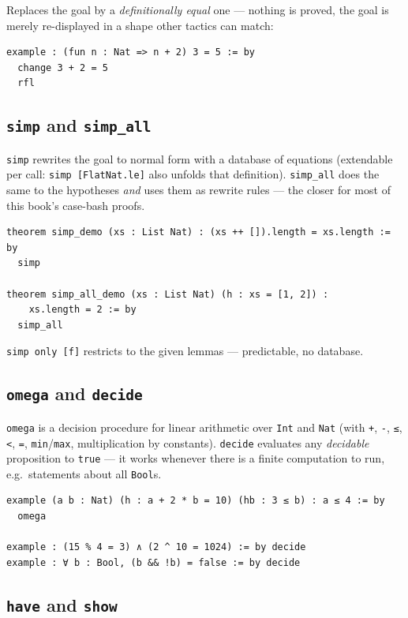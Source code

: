 \documentclass[12pt, a4paper, openright]{book}
\theoremstyle{thmstyle}
\theoremstyle{defstyle}
\newcommand{\lc}[1]{\texttt{#1}}
\begin{document}
Replaces the goal by a \emph{definitionally equal} one --- nothing is
proved, the goal is merely re-displayed in a shape other tactics can
match:

\begin{verbatim}
example : (fun n : Nat => n + 2) 3 = 5 := by
  change 3 + 2 = 5
  rfl
\end{verbatim}

\subsection*{\lc{simp} and \lc{simp\_all}}

\lc{simp} rewrites the goal to normal form with a database of equations
(extendable per call: \lc{simp [FlatNat.le]} also unfolds that
definition). \lc{simp\_all} does the same to the hypotheses \emph{and}
uses them as rewrite rules --- the closer for most of this book's
case-bash proofs.

\begin{verbatim}
theorem simp_demo (xs : List Nat) : (xs ++ []).length = xs.length := by
  simp

theorem simp_all_demo (xs : List Nat) (h : xs = [1, 2]) :
    xs.length = 2 := by
  simp_all
\end{verbatim}

\lc{simp only [f]} restricts to the given lemmas --- predictable, no
database.

\subsection*{\lc{omega} and \lc{decide}}

\lc{omega} is a decision procedure for linear arithmetic over \lc{Int} and
\lc{Nat} (with \lc{+}, \lc{-}, \lc{≤}, \lc{<}, \lc{=}, \lc{min}/\lc{max},
multiplication by constants). \lc{decide} evaluates any \emph{decidable}
proposition to \lc{true} --- it works whenever there is a finite
computation to run, e.g.\ statements about all \lc{Bool}s.

\begin{verbatim}
example (a b : Nat) (h : a + 2 * b = 10) (hb : 3 ≤ b) : a ≤ 4 := by
  omega

example : (15 % 4 = 3) ∧ (2 ^ 10 = 1024) := by decide
example : ∀ b : Bool, (b && !b) = false := by decide
\end{verbatim}

\subsection*{\lc{have} and \lc{show}}
\end{document}
